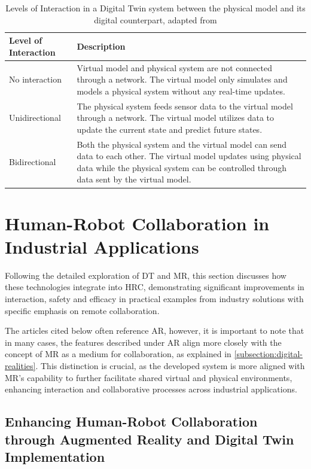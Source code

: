 \begin{table}[!htpb]
    \centering
    \caption{Levels of Interaction in a Digital Twin system between the physical model and its digital counterpart, adapted from \cite{liu2022state}}
    \label{tab:levels_of_control}
    \begin{tabular}{@{}l>{\raggedright\arraybackslash}p{10cm}@{}}
    \toprule
    Level of Interaction & Description \\ 
    \midrule
    No interaction & Virtual model and physical system are not connected through a network. The virtual model only simulates and models a physical 
    system without any real-time updates. \\ \hline
    Unidirectional & The physical system feeds sensor data to the virtual model through a network. The virtual model utilizes data to update the 
    current state and predict future states. \\ \hline
    Bidirectional & Both the physical system and the virtual model can send data to each other. The virtual model updates using physical data while 
    the physical system can be controlled through data sent by the virtual model. \\ 
    \bottomrule
    \end{tabular}
\end{table}


\section{Human-Robot Collaboration in Industrial Applications}
\label{sec:hrc-in-industry}
Following the detailed exploration of \ac{DT} and \ac{MR}, this section discusses how these technologies integrate into \ac{HRC}, demonstrating significant improvements in interaction, safety and efficacy in practical examples from industry solutions with specific emphasis on remote collaboration.

The articles cited below often reference \ac{AR}, however, it is important to note that in many cases, the features described under \ac{AR} align more closely with the concept of \ac{MR} as a medium for collaboration, as explained in \ref{subsection:digital-realities}. This distinction is crucial, as the developed system is more aligned with \ac{MR}’s capability to further facilitate shared virtual and physical environments, enhancing interaction and collaborative processes across industrial applications.

\subsection{Enhancing Human-Robot Collaboration through Augmented Reality and Digital Twin Implementation}
 
